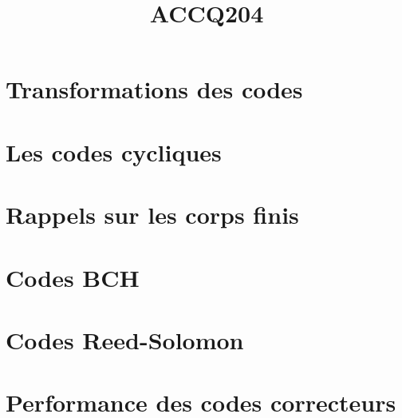 \documentclass[a4paper,9pt]{article}
\title{\vspace{-1.2cm} \textbf{ACCQ204}}
\begin{document}
\maketitle

\vspace{-1.5cm}

\section{Transformations des codes}

	

\section{Les codes cycliques}

	

\section{Rappels sur les corps finis}

	

\section{Codes BCH}

	

\section{Codes Reed-Solomon}

	


%	

\section{Performance des codes correcteurs}

	
\end{document}
